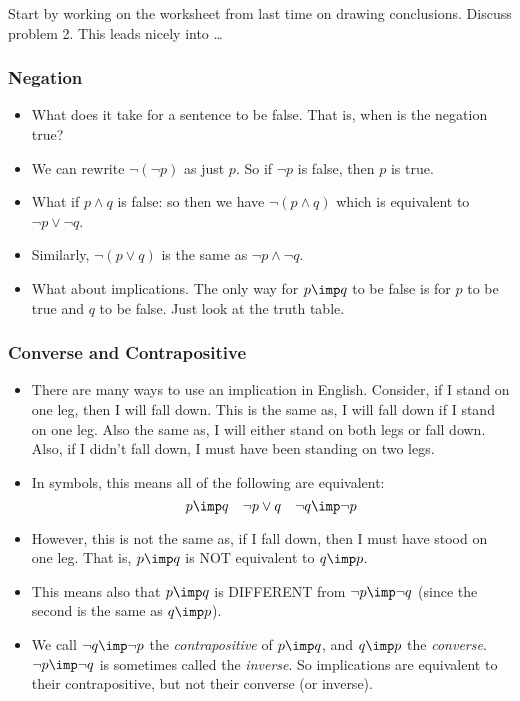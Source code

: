  Start by working on the worksheet from last time on drawing conclusions.  Discuss problem 2.  This leads nicely into \ldots


\subsubsection*{Negation}
\begin{itemize}
 \item What does it take for a sentence to be false.  That is, when is the negation true?
 \item We can rewrite $\neg(\neg p)$ as just $p$.  So if $\neg p$ is false, then $p$ is true.
 \item What if $p \wedge q$ is false: so then we have $\neg(p\wedge q)$ which is equivalent to $\neg p \vee \neg q$.
 \item Similarly, $\neg(p \vee q)$ is the same as $\neg p \wedge \neg q$.
 \item What about implications.  The only way for $p \imp q$ to be false is for $p$ to be true and $q$ to be false.  Just look at the truth table.
\end{itemize}

\subsubsection*{Converse and Contrapositive}
\begin{itemize}
	\item There are many ways to use an implication in English.  Consider, if I stand on one leg, then I will fall down.  This is the same as, I will fall down if I stand on one leg.  Also the same as, I will either stand on both legs or fall down.  Also, if I didn't fall down, I must have been standing on two legs.
	\item In symbols, this means all of the following are equivalent:
	\[p \imp q \quad \neg p \vee q \quad \neg q \imp \neg p\]
	\item However, this is not the same as, if I fall down, then I must have stood on one leg.  That is, $p \imp q$ is NOT equivalent to $q \imp p$. 
	\item This means also that $p \imp q$ is DIFFERENT from $\neg p \imp \neg q$ (since the second is the same as $q \imp p$).
	\item We call $\neg q \imp \neg p$ the {\em contrapositive} of $p \imp q$, and $q \imp p$ the {\em converse}. $\neg p \imp \neg q$ is sometimes called the {\em inverse}. So implications are equivalent to their contrapositive, but not their converse (or inverse).
\end{itemize}

